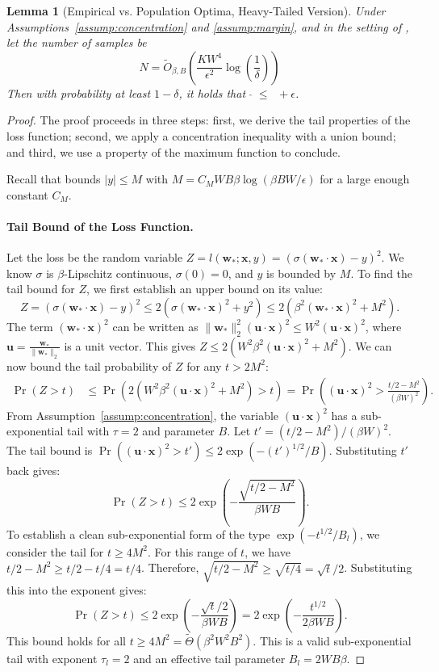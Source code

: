 \documentclass[11pt]{article}
\newcounter{thm}
\numberwithin{thm}{section}
\theoremstyle{plain}
\newtheorem{lemma}[thm]{Lemma}
\theoremstyle{definition}
\theoremstyle{remark} \newtheorem{remark}[thm]{Remark}
\def\vu{{\bm{u}}}
\def\vw{{\bm{w}}}
\def\vx{{\bm{x}}}
\DeclareMathOperator{\mOPT}{OPT_m}
\newcommand{\mOPThat}{\widehat{\mOPT}}
\begin{document}
\begin{lemma}[Empirical vs. Population Optima, Heavy-Tailed Version]
	\label{lemma:opt_opthat_heavy_tailed}
    Under Assumptions~\ref{assump:concentration} and \ref{assump:margin}, and in the setting of , let the number of samples be
    \[
        N = \tilde{O}_{\beta,B}\left(\frac{K W^4 }{\epsilon^2} \log \left( \frac 1 \delta \right) \right)
    \]
    Then with probability at least $1-\delta$, it holds that $\mOPThat \le \mOPT + \epsilon$.
\end{lemma}

\begin{proof}
The proof proceeds in three steps: 
first, we derive the tail properties of the loss function; 
second, we apply a concentration inequality with a union bound; and 
third, we use a property of the maximum function to conclude.

Recall that  bounds $|y| \le M$ with 
$M = C_M W B \beta \log(\beta B W / \epsilon)$ for a large enough constant $C_M$.

\paragraph{Tail Bound of the Loss Function.} 
Let the loss be the random variable $Z = l(\vw_*;\vx,y)=(\sigma(\vw_*\cdot\vx) - y)^2$. 
We know $\sigma$ is $\beta$-Lipschitz continuous, $\sigma(0) = 0$, 
and $y$ is bounded by $M$.
To find the tail bound for $Z$, we first establish an upper bound on its value:
\[
Z = (\sigma(\vw_*\cdot\vx) - y)^2 \le 2(\sigma(\vw_*\cdot\vx)^2 + y^2) \le 2(\beta^2(\vw_*\cdot\vx)^2 + M^2).
\]
The term $(\vw_*\cdot\vx)^2$ can be written as 
$\|\vw_*\|_2^2 (\vu\cdot\vx)^2 \le W^2 (\vu\cdot\vx)^2$, 
where $\vu = \frac{\vw_*}{\|\vw_*\|_2}$ is a unit vector. 
This gives $Z \le 2(W^2\beta^2(\vu\cdot\vx)^2 + M^2)$. 
We can now bound the tail probability of $Z$ for any $t > 2M^2$:
\begin{align*}
    \Pr(Z > t) 
	&\le \Pr(2(W^2\beta^2(\vu\cdot\vx)^2 + M^2) > t) 
	= \Pr\left((\vu\cdot\vx)^2 > \frac{t/2 - M^2}{(\beta W)^2}\right).
\end{align*}
From Assumption~\ref{assump:concentration}, 
the variable $(\vu\cdot\vx)^2$ has a sub-exponential tail with $\tau=2$ and parameter $B$.
Let $t' = (t/2 - M^2)/(\beta W)^2$. The tail bound is $\Pr((\vu\cdot\vx)^2 > t') \le 2\exp(-(t')^{1/2}/B)$. Substituting $t'$ back gives:
\[
\Pr(Z > t) \le 2\exp\left(-\frac{\sqrt{t/2 - M^2}}{\beta WB}\right).
\]
To establish a clean sub-exponential form of the type $\exp(-t^{1/2}/B_l)$, we consider the tail for $t \ge 4M^2$. For this range of $t$, we have $t/2 - M^2 \ge t/2 - t/4 = t/4$. Therefore, $\sqrt{t/2 - M^2} \ge \sqrt{t/4} = \sqrt{t}/2$. Substituting this into the exponent gives:
\[
\Pr(Z > t) \le 2\exp\left(-\frac{\sqrt{t}/2}{\beta WB}\right) = 2\exp\left(-\frac{t^{1/2}}{2\beta WB}\right).
\]
This bound holds for all $t \ge 4M^2 = \tilde{\Theta}(\beta^2 W^2B^2)$. 
This is a valid sub-exponential tail with exponent $\tau_l=2$ and an effective tail parameter $B_l = 2WB\beta$.


\end{proof}
\end{document}
